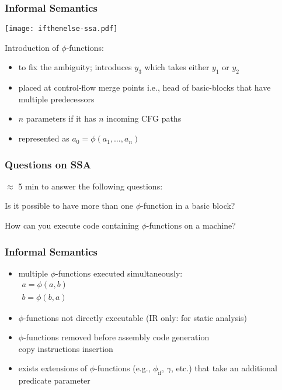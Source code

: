 \begin{frame}
\frametitle{Informal Semantics}
\texttt{[image: ifthenelse-ssa.pdf]}
\begin{minipage}[b]{0.5\textwidth}
  Introduction of $\phi$-functions:
\begin{itemize}
\item to fix the ambiguity; introduces $y_3$ which takes either $y_1$ or $y_2$
\item placed at control-flow merge points i.e., head of basic-blocks that have multiple predecessors
\end{itemize}
\vskip5mm
\end{minipage}
\begin{itemize}
\item $n$ parameters if it has $n$ incoming CFG paths
\item represented as $a_0=\phi(a_1, \dots, a_n)$
\end{itemize}
\end{frame}


\begin{frame}
  \frametitle{Questions on SSA}
  $\approx$ 5 min to answer the following questions:
  \begin{exampleblock}{}
    Is it possible to have more than one $\phi$-function in a basic block?
  \end{exampleblock}
  \begin{exampleblock}{}
    How can you execute code containing $\phi$-functions on a machine?
  \end{exampleblock}

\end{frame}

\begin{frame}
\frametitle{Informal Semantics}
\begin{itemize}
\item multiple $\phi$-functions executed simultaneously:\\ 
$
\begin{array}{l}
  a=\phi(a,b)\\
  b=\phi(b,a)
\end{array}
$
\item $\phi$-functions not directly executable (IR only: for static analysis)
\item $\phi$-functions removed before assembly code generation\\
  \handr copy instructions insertion
  \pause
\item exists extensions of $\phi$-functions (e.g., $\phi_{\textrm{if}}$, $\gamma$, etc.) that take an additional predicate parameter
\end{itemize}
\end{frame}

